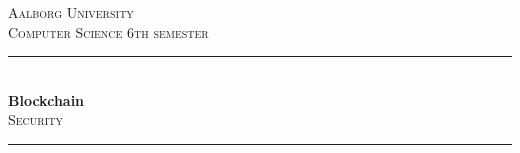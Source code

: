 %
\begin{titlepage}

\newcommand{\HRule}{\rule{\linewidth}{0.5mm}} %

\center %
\vspace*{2cm}

\textsc{\LARGE Aalborg University}\\[0.5cm] %
\textsc{\large Computer Science 6th semester}\\[1.0cm] %


\HRule \\[0.4cm]
{ \huge \bfseries Blockchain}\\[0.4cm] %
\textsc{\Large Security}\\[0.5cm]
\HRule \\[1.5cm]
 



\end{titlepage}
